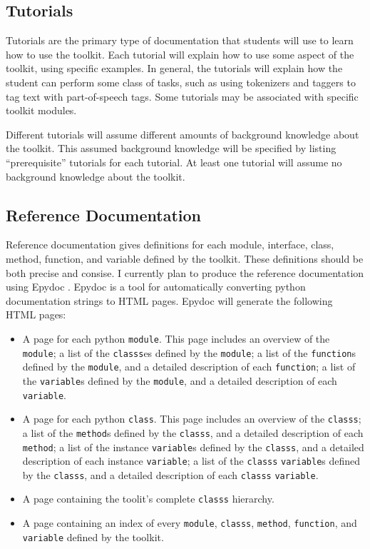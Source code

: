 \documentclass{article}
\begin{document}
\subsection{Tutorials}

Tutorials are the primary type of documentation that students will use
to learn how to use the toolkit.  Each tutorial will explain how to
use some aspect of the toolkit, using specific examples.  In general,
the tutorials will explain how the student can perform some class of
tasks, such as using tokenizers and taggers to tag text with
part-of-speech tags.  Some tutorials may be associated with specific
toolkit modules.

Different tutorials will assume different amounts of background
knowledge about the toolkit.  This assumed background knowledge will
be specified by listing ``prerequisite'' tutorials for each tutorial.
At least one tutorial will assume no background knowledge about the
toolkit.

\subsection{Reference Documentation}

Reference documentation gives definitions for each module, interface,
class, method, function, and variable defined by the toolkit.  These
definitions should be both precise and consise.  I currently plan to
produce the reference documentation using Epydoc \cite{epydoc}.
Epydoc is a tool for automatically converting python documentation
strings to HTML pages.  Epydoc will generate the following HTML pages:

\begin{itemize}
  \item A page for each python \texttt{module}.  This page includes an
  overview of the \texttt{module}; a list of the \texttt{classs}es
  defined by the \texttt{module}; a list of the \texttt{function}s
  defined by the \texttt{module}, and a detailed description of each
  \texttt{function}; a list of the \texttt{variable}s defined by the
  \texttt{module}, and a detailed description of each
  \texttt{variable}.

  \item A page for each python \texttt{class}.  This page includes an
  overview of the \texttt{classs}; a list of the \texttt{method}s
  defined by the \texttt{classs}, and a detailed description of each
  \texttt{method}; a list of the instance \texttt{variable}s defined
  by the \texttt{classs}, and a detailed description of each instance
  \texttt{variable}; a list of the \texttt{classs} \texttt{variable}s
  defined by the \texttt{classs}, and a detailed description of each
  \texttt{classs} \texttt{variable}.

  \item A page containing the toolit's complete \texttt{classs}
  hierarchy.

  \item A page containing an index of every \texttt{module},
  \texttt{classs}, \texttt{method}, \texttt{function}, and
  \texttt{variable} defined by the toolkit.

\end{itemize}
\end{document}
